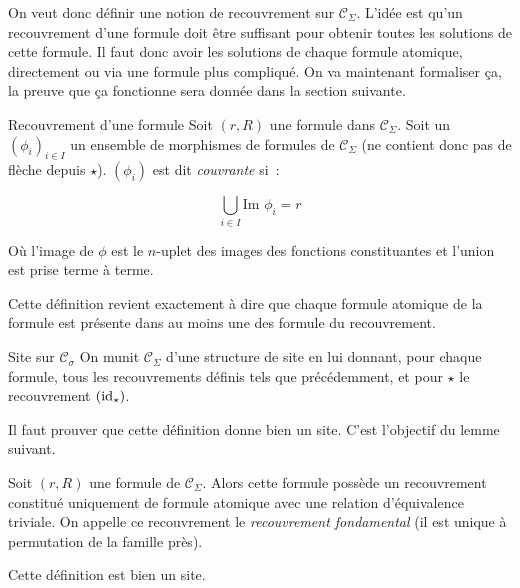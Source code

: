 \documentclass[12pt]{article}
\renewcommand\C{\mathscr{C}}
\newcommand\im{\text{Im }}
\begin{document}
On veut donc définir une notion de recouvrement sur $\C_\Sigma$. L'idée est qu'un
recouvrement d'une formule doit être suffisant pour obtenir toutes les solutions de
cette formule. Il faut donc avoir les solutions de chaque formule atomique, directement
ou via une formule plus compliqué. On va maintenant formaliser ça, la preuve que ça
fonctionne sera donnée dans la section suivante.

\begin{defi}{Recouvrement d'une formule}
    Soit $(r,R)$ une formule dans $\C_\Sigma$. Soit un $(\phi_i)_{i\in I}$ un ensemble
    de morphismes de formules de $\C_\Sigma$ (ne contient donc pas de flèche depuis
    $\star$). $(\phi_i)$ est dit \emph{couvrante} si~:

    \[ \bigcup_{i\in I} \im\phi_i = r \]

    Où l'image de $\phi$ est le $n$-uplet des images des fonctions constituantes et
    l'union est prise terme à terme.
\end{defi}

Cette définition revient exactement à dire que chaque formule atomique de la formule est
présente dans au moins une des formule du recouvrement.

\begin{defi}{Site sur $\C_\sigma$}
    On munit $\C_\Sigma$ d'une structure de site en lui donnant, pour chaque formule,
    tous les recouvrements définis tels que précédemment, et pour $\star$ le recouvrement
    $(\operatorname{id}_\star)$.
\end{defi}

Il faut prouver que cette définition donne bien un site. C'est l'objectif du
lemme suivant.

\begin{rem}
    Soit $(r,R)$ une formule de $\C_\Sigma$. Alors cette formule possède un
    recouvrement constitué uniquement de formule atomique avec une relation d'équivalence
    triviale. On appelle ce recouvrement le \emph{recouvrement fondamental}
    (il est unique à permutation de la famille près).
\end{rem}

\begin{lem}
    Cette définition est bien un site.
\end{lem}
\end{document}
